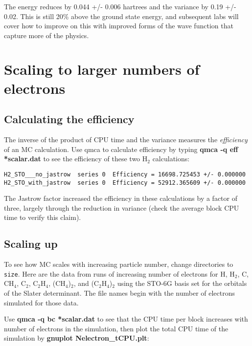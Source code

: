The energy reduces by 0.044 +/- 0.006 hartrees and the variance by 0.19 +/- 0.02.
This is still 20\% above the ground state energy, and subsequent labs will cover how
to improve on this with improved forms of the wave function that capture more
of the physics.

\section{Scaling to larger numbers of electrons}

\subsection{Calculating the efficiency}

The inverse of the product of CPU time and the variance measures the
\textit{efficiency} of an MC calculation.  Use qmca to calculate efficiency by
typing \textbf{qmca -q eff *scalar.dat} to see the efficiency of these two
H$_2$ calculations:

\begin{shaded}
\begin{verbatim}
H2_STO___no_jastrow  series 0  Efficiency = 16698.725453 +/- 0.000000 
H2_STO_with_jastrow  series 0  Efficiency = 52912.365609 +/- 0.000000 
\end{verbatim}
\end{shaded}

The Jastrow factor increased the efficiency in these calculations by a factor
of three, largely through the reduction in variance (check the average block
CPU time to verify this claim).

\subsection{Scaling up}

To see how MC scales with increasing particle number, change directories to
\texttt{size}.  Here are the data from runs of increasing number of electrons
for H, H$_2$, C, CH$_4$, C$_2$, C$_2$H$_4$, (CH$_4$)$_2$, and (C$_2$H$_4$)$_2$
using the STO-6G basis set for the orbitals of the Slater determinant.  The file names begin with the number of electrons simulated for those data.

Use \textbf{qmca -q bc *scalar.dat} to see that the CPU time per block
increases with number of electrons in the simulation, then plot the total CPU
time of the simulation by \textbf{gnuplot Nelectron\_tCPU.plt}:

